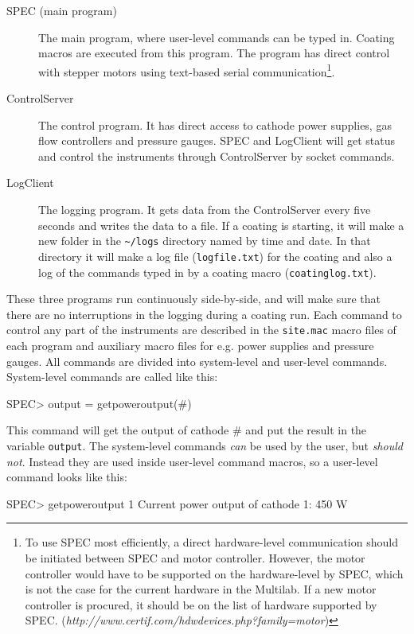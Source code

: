 \begin{description}
  \item[SPEC (main program)] The main program, where user-level commands can be typed in. Coating macros are executed from this program. The program has direct control with stepper motors using text-based serial communication\footnote{To use SPEC most efficiently, a direct hardware-level communication should be initiated between SPEC and motor controller. However, the motor controller would have to be supported on the hardware-level by SPEC, which is not the case for the current hardware in the Multilab. If a new motor controller is procured, it should be on the list of hardware supported by SPEC. (\emph{http://www.certif.com/hdwdevices.php?family=motor})}.
  \item[ControlServer] The control program. It has direct access to cathode power supplies, gas flow controllers and pressure gauges. SPEC and LogClient will get status and control the instruments through ControlServer by socket commands.
  \item[LogClient] The logging program. It gets data from the ControlServer every five seconds and writes the data to a file. If a coating is starting, it will make a new folder in the \verb'~/logs' directory named by time and date. In that directory it will make a log file (\verb'logfile.txt') for the coating and also a log of the commands typed in by a coating macro (\verb'coatinglog.txt').
\end{description}

These three programs run continuously side-by-side, and will make sure that there are no interruptions in the logging during a coating run. Each command to control any part of the instruments are described in the \verb'site.mac' macro files of each program and auxiliary macro files for e.g. power supplies and pressure gauges. All commands are divided into system-level and user-level commands. System-level commands are called like this:

\begin{verbcode}
  SPEC> output = getpoweroutput(#)
\end{verbcode}

This command will get the output of cathode \# and put the result in the variable \verb'output'. The system-level commands \emph{can} be used by the user, but \emph{should not}. Instead they are used inside user-level command macros, so a user-level command looks like this:

\begin{verbcode}
  SPEC> getpoweroutput 1
  Current power output of cathode 1: 450 W
\end{verbcode}

